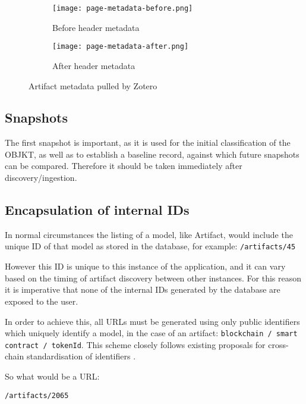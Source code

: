 \begin{figure}[H]
  \centering
  \begin{subfigure}[b]{0.45\textwidth}
    \centering
    \texttt{[image: page-metadata-before.png]}
    \caption{Before header metadata}
    \label{fig:image1}
  \end{subfigure}
  \hfill
  \begin{subfigure}[b]{0.45\textwidth}
    \centering
    \texttt{[image: page-metadata-after.png]}
    \caption{After header metadata}
    \label{fig:image2}
  \end{subfigure}
  \caption{Artifact metadata pulled by Zotero}
  \label{fig:zotero-metadata-comparison}
\end{figure}



\subsection{Snapshots}

The first snapshot is important, as it is used for the initial classification of the OBJKT, as well as to establish a baseline record, against which future snapshots can be compared.
Therefore it should be taken immediately after discovery/ingestion.



\subsection{Encapsulation of internal IDs}

In normal circumstances the listing of a model, like Artifact, would include the unique ID of that model as stored in the database, for example: \texttt{/artifacts/45}

However this ID is unique to this instance of the application, and it can vary based on the timing of artifact discovery between other instances.
For this reason it is imperative that none of the internal IDs generated by the database are exposed to the user.

In order to achieve this, all URLs must be generated using only public identifiers which uniquely identify a model, in the case of an artifact: \texttt{blockchain /  smart contract / tokenId}.
This scheme closely follows existing proposals for cross-chain standardisation of identifiers \cite{herzogAssetTypeAsset2020}.

So what would be a URL:

\texttt{/artifacts/2065}

